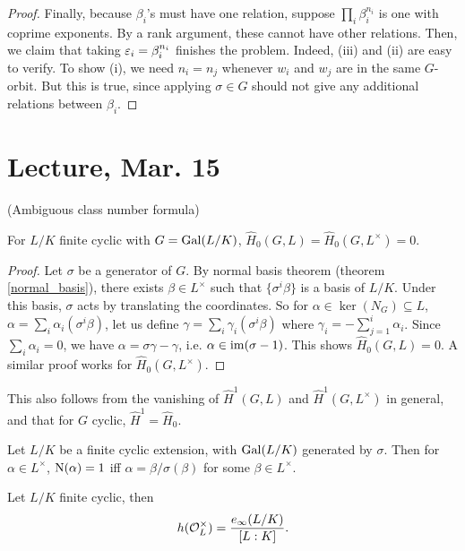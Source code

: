 \documentclass[11pt]{amsart}
\begin{document}
\begin{proof}
    Finally, because $\beta_i$'s must have one relation, suppose $\prod_i \beta_i^{n_i}$ is one with coprime exponents. By a rank argument, these cannot have other relations. Then, we claim that taking $\varepsilon_i = \beta_i^{n_i}$ finishes the problem. Indeed, (iii) and (ii) are easy to verify. To show (i), we need $n_i = n_j$ whenever $w_i$ and $w_j$ are in the same $G$-orbit. But this is true, since applying $\sigma\in G$ should not give any additional relations between $\beta_i$.
\end{proof}


\section{Lecture, Mar. 15}

(Ambiguous class number formula)

\begin{lem}[Noether]
    For $L/K$ finite cyclic with $G = \operatorname{Gal}(L/K)$, $\hat{H}_0(G, L) = \hat{H}_0(G,L^\times) = 0$.
\end{lem}

\begin{proof}
    Let $\sigma$ be a generator of $G$. By normal basis theorem (theorem \ref{normal_basis}), there exists $\beta\in L^\times$ such that $\{\sigma^i \beta\}$ is a basis of $L/K$. Under this basis, $\sigma$ acts by translating the coordinates. So for $\alpha\in \ker(N_G)\subseteq L$, $\alpha = \sum_i \alpha_i (\sigma^i\beta)$, let us define $\gamma = \sum_i \gamma_i(\sigma^i\beta)$ where $\gamma_i = - \sum_{j=1}^i \alpha_i$. Since $\sum_i \alpha_i = 0$, we have $\alpha = \sigma\gamma - \gamma$, i.e. $\alpha\in \operatorname{im}(\sigma-1)$. This shows $\hat{H}_0(G,L) = 0$. A similar proof works for $\hat{H}_0(G,L^\times)$.
\end{proof}

\begin{Rem}
    This also follows from the vanishing of $\hat{H}^1(G,L)$ and $\hat{H}^1(G,L^\times)$ in general, and that for $G$ cyclic, $\hat{H}^1 = \hat{H}_0$.
\end{Rem}


\begin{cor}
    Let $L/K$ be a finite cyclic extension, with $\operatorname{Gal}(L/K)$ generated by $\sigma$. Then for $\alpha\in L^\times$, $\operatorname{N}(\alpha) = 1$ iff $\alpha = \beta/\sigma(\beta)$ for some $\beta\in L^\times$.
\end{cor}

\begin{thm}
    Let $L/K$ finite cyclic, then 
    \[h(\mathcal{O}_L^\times) = \frac{e_\infty(L/K)}{[L:K]}.\]
\end{thm}
\end{document}
